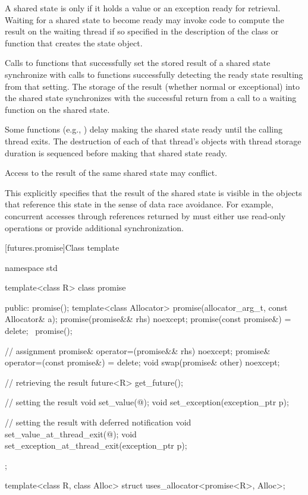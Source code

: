 \pnum
A shared state is  only if it holds a value or an exception ready for
retrieval.
Waiting for a shared state to become ready may invoke code to compute the result on
the waiting thread if so specified in the description of the class or function that creates
the state object.

\pnum
Calls to functions that successfully set the stored result of a shared
state synchronize
with calls to functions
successfully detecting the ready state resulting from that setting.
The storage of the result
(whether normal or exceptional) into the shared state
synchronizes with
the successful return from a call to a waiting function on the shared state.

\pnum
Some functions (e.g., ) delay making
the shared state ready until the calling thread exits. The destruction of
each of that thread's objects with thread storage duration
is sequenced before making that shared state ready.

\pnum
Access to the result of the same shared state may conflict.
\begin{note}
This explicitly specifies that the result of the shared state is
visible in the objects that reference this state in the sense of data race
avoidance. For example, concurrent accesses through
references returned by 
must either use read-only operations or provide additional synchronization.
\end{note}

[futures.promise]{Class template }

%
\begin{codeblock}
namespace std {
  template<class R>
  class promise {
  public:
    promise();
    template<class Allocator>
      promise(allocator_arg_t, const Allocator& a);
    promise(promise&& rhs) noexcept;
    promise(const promise&) = delete;
    ~promise();

    // assignment
    promise& operator=(promise&& rhs) noexcept;
    promise& operator=(const promise&) = delete;
    void swap(promise& other) noexcept;

    // retrieving the result
    future<R> get_future();

    // setting the result
    void set_value(@\seebelow@);
    void set_exception(exception_ptr p);

    // setting the result with deferred notification
    void set_value_at_thread_exit(@\seebelow@);
    void set_exception_at_thread_exit(exception_ptr p);
  };

  template<class R, class Alloc>
    struct uses_allocator<promise<R>, Alloc>;
}
\end{codeblock}

